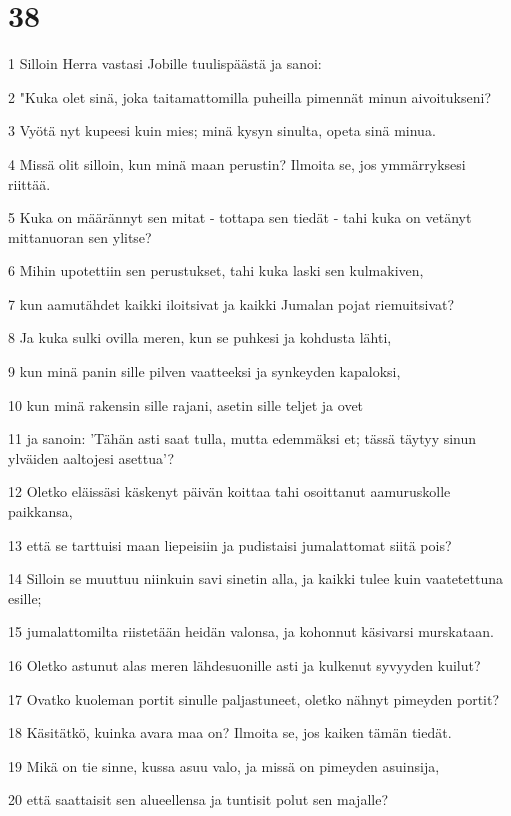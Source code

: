 \chapter{38}

\par 1 Silloin Herra vastasi Jobille tuulispäästä ja sanoi:
\par 2 "Kuka olet sinä, joka taitamattomilla puheilla pimennät minun aivoitukseni?
\par 3 Vyötä nyt kupeesi kuin mies; minä kysyn sinulta, opeta sinä minua.
\par 4 Missä olit silloin, kun minä maan perustin? Ilmoita se, jos ymmärryksesi riittää.
\par 5 Kuka on määrännyt sen mitat - tottapa sen tiedät - tahi kuka on vetänyt mittanuoran sen ylitse?
\par 6 Mihin upotettiin sen perustukset, tahi kuka laski sen kulmakiven,
\par 7 kun aamutähdet kaikki iloitsivat ja kaikki Jumalan pojat riemuitsivat?
\par 8 Ja kuka sulki ovilla meren, kun se puhkesi ja kohdusta lähti,
\par 9 kun minä panin sille pilven vaatteeksi ja synkeyden kapaloksi,
\par 10 kun minä rakensin sille rajani, asetin sille teljet ja ovet
\par 11 ja sanoin: 'Tähän asti saat tulla, mutta edemmäksi et; tässä täytyy sinun ylväiden aaltojesi asettua'?
\par 12 Oletko eläissäsi käskenyt päivän koittaa tahi osoittanut aamuruskolle paikkansa,
\par 13 että se tarttuisi maan liepeisiin ja pudistaisi jumalattomat siitä pois?
\par 14 Silloin se muuttuu niinkuin savi sinetin alla, ja kaikki tulee kuin vaatetettuna esille;
\par 15 jumalattomilta riistetään heidän valonsa, ja kohonnut käsivarsi murskataan.
\par 16 Oletko astunut alas meren lähdesuonille asti ja kulkenut syvyyden kuilut?
\par 17 Ovatko kuoleman portit sinulle paljastuneet, oletko nähnyt pimeyden portit?
\par 18 Käsitätkö, kuinka avara maa on? Ilmoita se, jos kaiken tämän tiedät.
\par 19 Mikä on tie sinne, kussa asuu valo, ja missä on pimeyden asuinsija,
\par 20 että saattaisit sen alueellensa ja tuntisit polut sen majalle?
